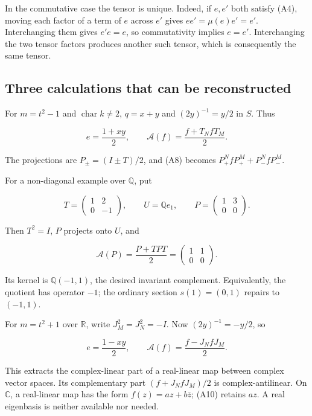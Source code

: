 \documentclass[
  11pt,
]{article}
\begin{document}
In the commutative case the tensor is unique. Indeed, if \(e,e'\) both
satisfy (A4), moving each factor of a term of \(e\) across \(e'\) gives
\(ee'=\mu(e)e'=e'\). Interchanging them gives \(e'e=e\), so
commutativity implies \(e=e'\). Interchanging the two tensor factors
produces another such tensor, which is consequently the same tensor.

\subsection{Three calculations that can be
reconstructed}\label{three-calculations-that-can-be-reconstructed}

For \(m=t^2-1\) and \(\operatorname{char}k\ne2\), \(q=x+y\) and
\((2y)^{-1}=y/2\) in \(S\). Thus

\[
e=\frac{1+xy}{2},\qquad
\mathcal A(f)=\frac{f+T_N fT_M}{2}.                 \tag{A9}
\]

The projections are \(P_\pm=(I\pm T)/2\), and (A8) becomes
\(P_+^NfP_+^M+P_-^NfP_-^M\).

For a non-diagonal example over \(\mathbb Q\), put

\[
T=\begin{pmatrix}1&2\\0&-1\end{pmatrix},\qquad
U=\mathbb Q e_1,\qquad
P=\begin{pmatrix}1&3\\0&0\end{pmatrix}.
\]

Then \(T^2=I\), \(P\) projects onto \(U\), and

\[
\mathcal A(P)=\frac{P+TPT}{2}
             =\begin{pmatrix}1&1\\0&0\end{pmatrix}.
\]

Its kernel is \(\mathbb Q(-1,1)\), the desired invariant complement.
Equivalently, the quotient has operator \(-1\); the ordinary section
\(s(1)=(0,1)\) repairs to \((-1,1)\).

For \(m=t^2+1\) over \(\mathbb R\), write \(J_M^2=J_N^2=-I\). Now
\((2y)^{-1}=-y/2\), so

\[
e=\frac{1-xy}{2},\qquad
\mathcal A(f)=\frac{f-J_N fJ_M}{2}.                \tag{A10}
\]

This extracts the complex-linear part of a real-linear map between
complex vector spaces. Its complementary part \((f+J_N fJ_M)/2\) is
complex-antilinear. On \(\mathbb C\), a real-linear map has the form
\(f(z)=az+b\bar z\); (A10) retains \(az\). A real eigenbasis is neither
available nor needed.
\end{document}
